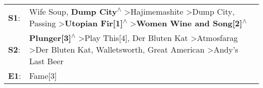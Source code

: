 \begin{supertabular}{p{0.03\textwidth}p{0.92\textwidth}}
 \textbf{S1}:  &                Wife Soup\textsuperscript{}, \enspace \textbf{Dump City\textsuperscript{$\wedge$}} \textgreater \enspace Hajimemashite\textsuperscript{} \textgreater \enspace Dump City\textsuperscript{}, \enspace Passing\textsuperscript{} \textgreater \enspace \textbf{Utopian Fir[1]\textsuperscript{$\wedge$}} \textgreater \enspace \textbf{Women Wine and Song[2]\textsuperscript{$\wedge$}}  \enspace  \\
 \textbf{S2}:  &  \textbf{Plunger[3]\textsuperscript{$\wedge$}} \textgreater \enspace Play This[4]\textsuperscript{}, \enspace Der Bluten Kat\textsuperscript{} \textgreater \enspace Atmosfarag\textsuperscript{} \textgreater \enspace Der Bluten Kat\textsuperscript{}, \enspace Walletsworth\textsuperscript{}, \enspace Great American\textsuperscript{} \textgreater \enspace Andy's Last Beer\textsuperscript{}  \enspace  \\
 \textbf{E1}:  &                                                                                                                                                                                                                                                                                                                                                                             Fame[3]\textsuperscript{}  \enspace  \\
\end{supertabular}

